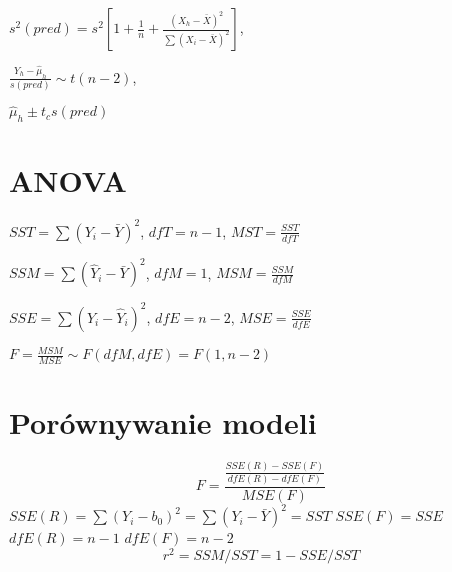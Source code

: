\documentclass[9pt]{article}  %
\begin{document}
  
    $s^2 (pred) = s^2 \left[ 1+ \frac{1}{n} + \frac{(X_h-\bar{X})^2 }{\sum{(X_i-\bar{X})^2} }   \right]$,
    
    $ \frac{Y_h -  \hat{\mu}_h }{s(pred)} \sim t(n-2)$,


    $\hat{\mu}_h \pm t_c s(pred) $
    
\section{ANOVA}


  
  $ SST = \sum(Y_i - \bar{Y})^2  $,
  $dfT = n-1$,
  $ MST = \frac{SST}{dfT}$
  
  

  
  $ SSM = \sum(\hat{Y}_i - \bar{Y})^2  $,
  $dfM = 1$,
  $ MSM = \frac{SSM}{dfM}$
  

  
    $ SSE = \sum(Y_i - \hat{Y}_i)^2  $,
  $dfE = n-2$,
  $ MSE = \frac{SSE}{dfE}$
  
  

  
  $F = \frac{MSM}{MSE} \sim F(dfM, dfE) = F(1, n-2)$
  
  
  \section{Porównywanie modeli}
  
  $$F = \frac{ \frac{ SSE(R) - SSE(F)  }{ dfE(R) - dfE(F)  } }{ MSE(F)}$$
  $SSE(R) = \sum{\left( Y_i - b_0 \right)^2} = \sum{\left( Y_i - \bar{Y} \right)^2} = SST$
  $SSE(F) = SSE$
  $dfE(R) = n-1$
  $dfE(F) = n-2$
  $$r^2 = SSM/SST = 1-SSE/SST$$
  
  
\end{document}
